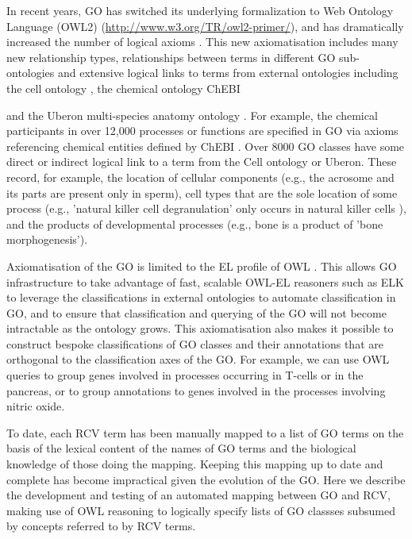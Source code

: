 \documentclass[runningheads,a4paper]{llncs}
\begin{document}
{In recent years, \ac{GO} has switched its underlying formalization to Web Ontology Language (OWL2) (\url{http://www.w3.org/TR/owl2-primer/}), and has dramatically increased the number of logical axioms \cite{Mungall2014}. This new axiomatisation includes many new relationship types, relationships between terms in different \ac{GO} sub-ontologies and extensive logical links to terms from external ontologies including the cell ontology \cite{Meehan2011}, the chemical ontology ChEBI {\cite{Hastings2013} and the Uberon multi-species anatomy ontology \cite{Haendel2014}.  For example, the chemical participants in over 12,000 processes or functions are specified in \ac{GO} via axioms referencing chemical entities defined by ChEBI \cite{Hill2013}. Over 8000 \ac{GO} classes have some direct or indirect logical link to a term from the Cell ontology or Uberon. These record, for example, the location of cellular components (e.g., the acrosome and its parts are present only in sperm), cell types that are the sole location of some process (e.g., 'natural killer cell degranulation' only occurs in natural killer cells ), and the products of developmental processes (e.g., bone is a product of 'bone morphogenesis').

Axiomatisation of the \ac{GO} is limited to the EL profile of OWL \cite{Mungall2014}. This allows \ac{GO} infrastructure to take advantage of fast, scalable OWL-EL reasoners such as ELK \cite{kazakov2012} to leverage the classifications in external ontologies to automate classification in \ac{GO}, and to ensure that classification and querying of the \ac{GO} will not become intractable as the ontology grows.  This axiomatisation also makes it possible to construct bespoke classifications of GO classes and their annotations that are orthogonal to the classification axes of the GO. For example, we can use OWL queries to group genes involved in processes occurring in T-cells or in the pancreas, or to group annotations to genes involved in the processes involving nitric oxide.

To date, each RCV term has been manually mapped to a list of GO terms on the basis of the lexical content of the names of \ac{GO} terms and the biological knowledge of those doing the mapping.  Keeping this mapping up to date and complete has become impractical given the evolution of the \ac{GO}.  Here we describe the development and testing of an automated mapping between \ac{GO} and RCV, making use of OWL reasoning to logically specify lists of GO classses subsumed by concepts referred to by RCV terms.

}}
\end{document}
